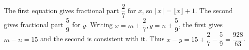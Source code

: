 The first equation gives fractional part $\dfrac{2}{7}$ for $x$, so $\lceil x\rceil=\lfloor x\rfloor+1$. The second gives fractional part $\dfrac{5}{9}$ for $y$. Writing $x = m + \dfrac{2}{7} , y = n + \dfrac{5}{9}$, the first gives $m-n=15$ and the second is consistent with it. Thus $x - y = 15 + \dfrac{2}{7} - \dfrac{5}{9} = \boxed{\dfrac{928}{63}}$.
